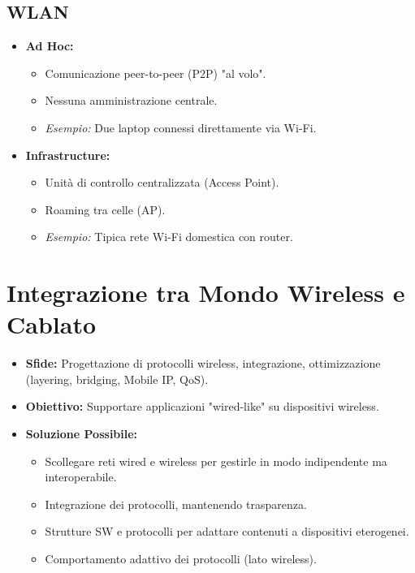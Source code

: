 \subsection{WLAN}
\begin{itemize}
    \item \textbf{Ad Hoc:}
    \begin{itemize}
        \item Comunicazione peer-to-peer (P2P) "al volo".
        \item Nessuna amministrazione centrale.
        \item \textit{Esempio:} Due laptop connessi direttamente via Wi-Fi.
    \end{itemize}
    \item \textbf{Infrastructure:}
    \begin{itemize}
        \item Unità di controllo centralizzata (Access Point).
        \item Roaming tra celle (AP).
        \item \textit{Esempio:} Tipica rete Wi-Fi domestica con router.
    \end{itemize}
\end{itemize}

\section{Integrazione tra Mondo Wireless e Cablato}
\begin{itemize}
    \item \textbf{Sfide:} Progettazione di protocolli wireless, integrazione, ottimizzazione (layering, bridging, Mobile IP, QoS).
    \item \textbf{Obiettivo:} Supportare applicazioni "wired-like" su dispositivi wireless.
    \item \textbf{Soluzione Possibile:}
    \begin{itemize}
        \item Scollegare reti wired e wireless per gestirle in modo indipendente ma interoperabile.
        \item Integrazione dei protocolli, mantenendo trasparenza.
        \item Strutture SW e protocolli per adattare contenuti a dispositivi eterogenei.
        \item Comportamento adattivo dei protocolli (lato wireless).
    \end{itemize}
\end{itemize}

